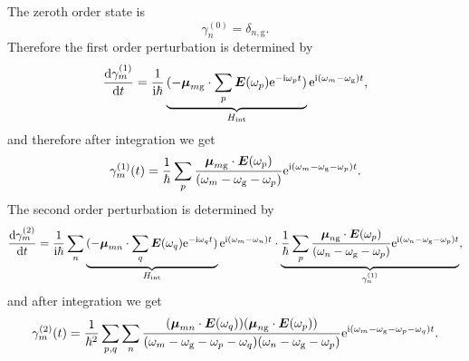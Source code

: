\documentclass[hyperref, a4paper]{article}
\newcommand*{\ii}{\mathrm{i}}
\newcommand*{\ee}{\mathrm{e}}
\newcommand*{\omegag}{\omega_{\text{g}}}
\begin{document}
The zeroth order state is  
\begin{equation}
    \gamma^{(0)}_n = \delta_{n, \text{g}} .
\end{equation}
Therefore the first order perturbation is determined by 
\begin{equation}
    \dv{\gamma_m^{(1)}}{t} = \frac{1}{\ii \hbar} 
    \underbrace{
        (- \vb*{\mu}_{m \text{g}} \cdot \sum_p \vb*{E}(\omega_p) \ee^{- \ii \omega_p t}) 
    }_{H_{\text{int}}}
    \ee^{\ii (\omega_m - \omegag) t} ,
\end{equation}
and therefore after integration we get 
\begin{equation}
    \gamma_m^{(1)}(t) = \frac{1}{\hbar} \sum_p \frac{\vb*{\mu}_{m \text{g}} \cdot \vb*{E}(\omega_p)}{(\omega_m - \omegag - \omega_p)} \ee^{\ii (\omega_m - \omegag - \omega_p) t}.
\end{equation}
The second order perturbation is determined by 
\begin{equation}
    \dv{\gamma_m^{(2)}}{t} = \frac{1}{\ii \hbar} \sum_n
    \underbrace{
        (- \vb*{\mu}_{m n} \cdot \sum_q \vb*{E}(\omega_q) \ee^{- \ii \omega_q t}) 
    }_{H_{\text{int}}}
    \ee^{\ii (\omega_m - \omega_n) t} 
    \cdot \underbrace{\frac{1}{\hbar} \sum_p \frac{\vb*{\mu}_{n \text{g}} \cdot \vb*{E}(\omega_p)}{(\omega_n - \omegag - \omega_p)} \ee^{\ii (\omega_n - \omegag - \omega_p) t}}_{\gamma_n^{(1)}} ,
\end{equation}
and after integration we get 
\begin{equation}
    \gamma_m^{(2)}(t) = \frac{1}{\hbar^2} \sum_{p, q} \sum_n
    \frac{
        (\vb*{\mu}_{mn} \cdot \vb*{E}(\omega_q)) (\vb*{\mu}_{n \text{g}} \cdot \vb*{E}(\omega_p))
    }{
        (\omega_m - \omegag - \omega_p - \omega_q)
        (\omega_n - \omegag - \omega_p)
    } \ee^{\ii (\omega_m - \omegag - \omega_p - \omega_q) t}.
\end{equation}
\end{document}
